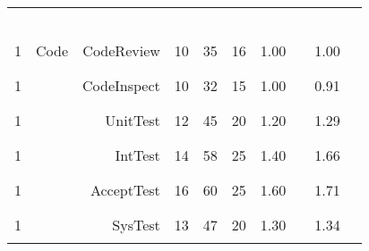 {\begin{tabular}{c@{~}|l@{~}r@{~}|rrr|r@{~}l|r@{~}l}
\hline\multicolumn{10}{c}{~}  \\
1 &  Code   &   CodeReview    & 10 & 35 & 16 & 1.00 & \textcolor{black}{\rule{10mm}{2mm}} & 1.00 & \textcolor{Gray}{\rule{10mm}{2mm}}\\
1 &    &   CodeInspect   & 10 & 32 & 15 & 1.00 & \textcolor{black}{\rule{10mm}{2mm}} & 0.91 & \textcolor{Gray}{\rule{9mm}{2mm}}\\
1 &   &   UnitTest      & 12 & 45 & 20 & 1.20 & \textcolor{black}{\rule{12mm}{2mm}} & 1.29 & \textcolor{Gray}{\rule{12mm}{2mm}}\\
1 &    &   IntTest       & 14 & 58 & 25 & 1.40 & \textcolor{black}{\rule{14mm}{2mm}} & 1.66 & \textcolor{Gray}{\rule{16mm}{2mm}}\\
1 &    &   AcceptTest    & 16 & 60 & 25 & 1.60 & \textcolor{black}{\rule{16mm}{2mm}} & 1.71 & \textcolor{Gray}{\rule{17mm}{2mm}}\\
1 &   &   SysTest       & 13 & 47 & 20 & 1.30 & \textcolor{black}{\rule{13mm}{2mm}} & 1.34 & \textcolor{Gray}{\rule{13mm}{2mm}}\\

\end{tabular}}